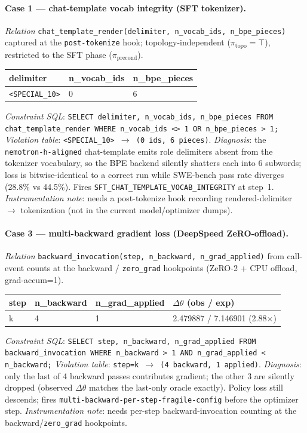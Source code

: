 \paragraph{Case 1 — chat-template vocab integrity (SFT tokenizer).}
\emph{Relation} \texttt{chat\_template\_render(delimiter, n\_vocab\_ids, n\_bpe\_pieces)} captured at the \texttt{post-tokenize} hook; topology-independent ($\pi_{\text{topo}}=\top$), restricted to the SFT phase ($\pi_{\text{precond}}$).
\begin{center}\small
\begin{tabular}{@{}lll@{}}
\toprule
delimiter & n\_vocab\_ids & n\_bpe\_pieces \\\midrule
\texttt{<SPECIAL\_10>} & 0 & 6 \\\bottomrule
\end{tabular}
\end{center}
\emph{Constraint SQL}: \texttt{SELECT delimiter, n\_vocab\_ids, n\_bpe\_pieces FROM chat\_template\_render WHERE n\_vocab\_ids <> 1 OR n\_bpe\_pieces > 1;}
\quad\emph{Violation table}: \texttt{<SPECIAL\_10> $\to$ (0 ids, 6 pieces)}.
\quad\emph{Diagnosis}: the \texttt{nemotron-h-aligned} chat-template emits role delimiters absent from the tokenizer vocabulary, so the BPE backend silently shatters each into 6 subwords; loss is bitwise-identical to a correct run while SWE-bench pass rate diverges (28.8\% vs 44.5\%). Fires \texttt{SFT\_CHAT\_TEMPLATE\_VOCAB\_INTEGRITY} at step~1.
\emph{Instrumentation note}: needs a post-tokenize hook recording rendered-delimiter $\to$ tokenization (not in the current model/optimizer dumps).

\paragraph{Case 3 — multi-backward gradient loss (DeepSpeed ZeRO-offload).}
\emph{Relation} \texttt{backward\_invocation(step, n\_backward, n\_grad\_applied)} from call-event counts at the backward / \texttt{zero\_grad} hookpoints (ZeRO-2 + CPU offload, grad-accum=1).
\begin{center}\small
\begin{tabular}{@{}llll@{}}
\toprule
step & n\_backward & n\_grad\_applied & $\Delta\theta$ (obs / exp) \\\midrule
k & 4 & 1 & 2.479887 / 7.146901 (2.88$\times$) \\\bottomrule
\end{tabular}
\end{center}
\emph{Constraint SQL}: \texttt{SELECT step, n\_backward, n\_grad\_applied FROM backward\_invocation WHERE n\_backward > 1 AND n\_grad\_applied < n\_backward;}
\quad\emph{Violation table}: \texttt{step=k $\to$ (4 backward, 1 applied)}.
\quad\emph{Diagnosis}: only the last of 4 backward passes contributes gradient; the other 3 are silently dropped (observed $\Delta\theta$ matches the last-only oracle exactly). Policy loss still descends; fires \texttt{multi-backward-per-step-fragile-config} before the optimizer step.
\emph{Instrumentation note}: needs per-step backward-invocation counting at the backward/\texttt{zero\_grad} hookpoints.

